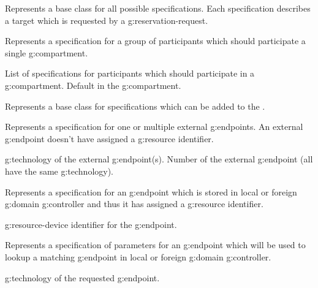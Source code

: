 \begin{Api}
Represents a base class for all possible specifications. Each specification describes a target which is requested by a \gls{g:reservation-request}.

Represents a specification for a group of participants which should participate a single \gls{g:compartment}.
\begin{ApiClassAttributes}
 List of specifications for participants which should participate in a \gls{g:compartment}.
 Default  in the \gls{g:compartment}.
\end{ApiClassAttributes}

Represents a base class for specifications which can be added to the .

Represents a specification for one or multiple external \glspl{g:endpoint}. An external \gls{g:endpoint} doesn't have assigned a \gls{g:resource} identifier.
\begin{ApiClassAttributes}
 \Gls{g:technology} of the external \gls{g:endpoint}(s).
 Number of the external \gls{g:endpoint} (all have the same \gls{g:technology}).
\end{ApiClassAttributes}

Represents a specification for an \gls{g:endpoint} which is stored in local or foreign \gls{g:domain} \gls{g:controller} and thus it has assigned a \gls{g:resource} identifier.
\begin{ApiClassAttributes}
 \Gls{g:resource-device} identifier for the \gls{g:endpoint}.
\end{ApiClassAttributes}

Represents a specification of parameters for an \gls{g:endpoint} which will be used to lookup a matching \gls{g:endpoint} in local or foreign \gls{g:domain} \gls{g:controller}.
\begin{ApiClassAttributes}
 \Gls{g:technology} of the requested \gls{g:endpoint}.
\end{ApiClassAttributes}


\end{Api}
